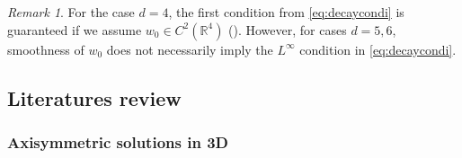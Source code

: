 \documentclass[11pt]{amsart}
\newcommand{\Red}[1]{\begingroup\color{red} #1\endgroup} %
\newcommand{\Blue}[1]{\begingroup\color{blue} #1\endgroup}
\theoremstyle{definition}
\theoremstyle{remark}
\newtheorem{remark}[theorem]{Remark}
\numberwithin{equation}{section}
\numberwithin{equation}{section}
\newcommand{\0}{\emptyset}
\newcommand{\ift}{\infty}
\newcommand{\bbR}{\mathbb R}
\begin{document}

	
	
	\begin{remark}
		For the case $d=4$, the first condition from \eqref{eq:decaycondi} is guaranteed if we assume $w_{0}\in C^{2}(\bbR^{4})$ (\cite[Prop. A.1]{CJL_gwpbi}). However, for cases $d=5,6$, smoothness of $w_{0}$ does not necessarily imply the $L^{\ift}$ condition in \eqref{eq:decaycondi}.
	\end{remark}

	\subsection{Literatures review}
	
	\subsubsection{Axisymmetric solutions in 3D}
	
\end{document}

